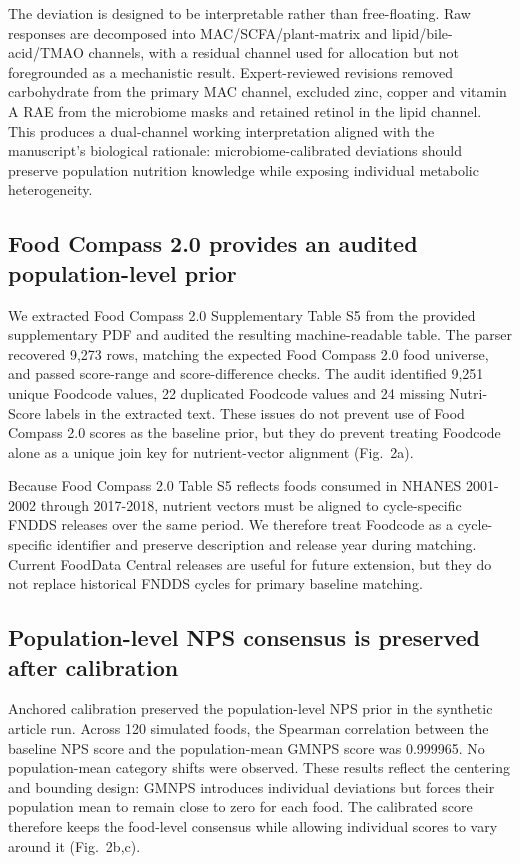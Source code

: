 The deviation is designed to be interpretable rather than free-floating. Raw
responses are decomposed into MAC/SCFA/plant-matrix and lipid/bile-acid/TMAO
channels, with a residual channel used for allocation but not foregrounded as a
mechanistic result. Expert-reviewed revisions removed carbohydrate from the
primary MAC channel, excluded zinc, copper and vitamin A RAE from the
microbiome masks and retained retinol in the lipid channel. This produces a
dual-channel working interpretation aligned with the manuscript's biological
rationale: microbiome-calibrated deviations should preserve population
nutrition knowledge while exposing individual metabolic heterogeneity.

\subsection*{Food Compass 2.0 provides an audited population-level prior}

We extracted Food Compass 2.0 Supplementary Table S5 from the provided
supplementary PDF and audited the resulting machine-readable table. The parser
recovered 9,273 rows, matching the expected Food Compass 2.0 food universe, and
passed score-range and score-difference checks. The audit identified 9,251
unique Foodcode values, 22 duplicated Foodcode values and 24 missing
Nutri-Score labels in the extracted text. These issues do not prevent use of
Food Compass 2.0 scores as the baseline prior, but they do prevent treating
Foodcode alone as a unique join key for nutrient-vector alignment (Fig.~2a).

Because Food Compass 2.0 Table S5 reflects foods consumed in NHANES 2001-2002
through 2017-2018, nutrient vectors must be aligned to cycle-specific FNDDS
releases over the same period. We therefore treat Foodcode as a cycle-specific
identifier and preserve description and release year during matching. Current
FoodData Central releases are useful for future extension, but they do not
replace historical FNDDS cycles for primary baseline matching.

\subsection*{Population-level NPS consensus is preserved after calibration}

Anchored calibration preserved the population-level NPS prior in the synthetic
article run. Across 120 simulated foods, the Spearman correlation between the
baseline NPS score and the population-mean GMNPS score was 0.999965. No
population-mean category shifts were observed. These results reflect the
centering and bounding design: GMNPS introduces individual deviations but forces
their population mean to remain close to zero for each food. The calibrated
score therefore keeps the food-level consensus while allowing individual
scores to vary around it (Fig.~2b,c).

